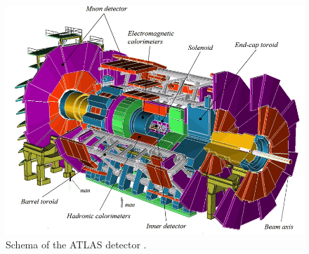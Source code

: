 \begin{figure}[!h]
\centering
\includegraphics[scale = 0.5]{Images/ATLAS/Atlas.png}
\caption[Schema of the ATLAS detector]{Schema of the ATLAS detector \cite{AtlasWeb}.}
\label{AtlasDec}
\end{figure}

